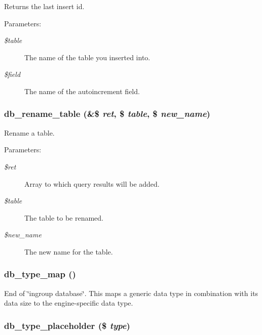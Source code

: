 Returns the last insert id.

\begin{Desc}
\item[Parameters:]
\begin{description}
\item[{\em \$table}]The name of the table you inserted into. \item[{\em \$field}]The name of the autoincrement field. \end{description}
\end{Desc}
\hypertarget{group__schemaapi_gbb4d2d8b00f915ba7e8c0a9d985d597d}{
\subsubsection[{db\_\-rename\_\-table}]{\setlength{\rightskip}{0pt plus 5cm}db\_\-rename\_\-table (\&\$ {\em ret}, \/  \$ {\em table}, \/  \$ {\em new\_\-name})}}
\label{group__schemaapi_gbb4d2d8b00f915ba7e8c0a9d985d597d}


Rename a table.

\begin{Desc}
\item[Parameters:]
\begin{description}
\item[{\em \$ret}]Array to which query results will be added. \item[{\em \$table}]The table to be renamed. \item[{\em \$new\_\-name}]The new name for the table. \end{description}
\end{Desc}
\hypertarget{group__schemaapi_gadf0495656599ba9336d68675b54f8dd}{
\subsubsection[{db\_\-type\_\-map}]{\setlength{\rightskip}{0pt plus 5cm}db\_\-type\_\-map ()}}
\label{group__schemaapi_gadf0495656599ba9336d68675b54f8dd}


End of \char`\"{}ingroup database\char`\"{}. This maps a generic data type in combination with its data size to the engine-specific data type. \hypertarget{group__schemaapi_g1d594f0ad0eab77e4b925887be7e4b08}{
\subsubsection[{db\_\-type\_\-placeholder}]{\setlength{\rightskip}{0pt plus 5cm}db\_\-type\_\-placeholder (\$ {\em type})}}
\label{group__schemaapi_g1d594f0ad0eab77e4b925887be7e4b08}


